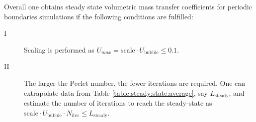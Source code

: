 \documentclass[review,12pt]{elsarticle}
\newcommand{\ububble}{U_{\mathrm{bubble}}}
\newcommand{\cstar}{C^{*}}
\begin{document}
Overall one obtains  steady state volumetric mass transfer coefficients for
periodic boundaries simulations if the following conditions are fulfilled:
\begin{description}
\item[I] Scaling is performed as $U_{max}=\mathrm{scale}\cdot\ububble\leq 0.1$.
\item[II] The larger the Peclet number, the fewer iterations are required. One can extrapolate data from Table
\ref{table:steady:state:average}, say $L_{\mathrm{steady}}$, and estimate the  number of
iterations to reach the steady-state as $\mathrm{scale}\cdot \ububble\cdot N_{\mathrm{iter}}\leq L_{\mathrm{steady}}$. 
\end{description}
\end{document}
